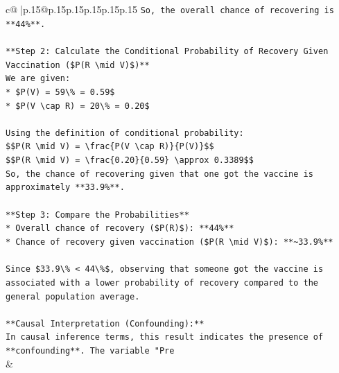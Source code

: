 \documentclass{article}
\begin{document}
{\begin{supertabular}{c@{$\;$}|p{.15\linewidth}@{}p{.15\linewidth}p{.15\linewidth}p{.15\linewidth}p{.15\linewidth}p{.15\linewidth}}
{{{\texttt{So, the overall chance of recovering is **44\%**.} \\
\\ 
\texttt{**Step 2: Calculate the Conditional Probability of Recovery Given Vaccination (\$P(R \textbackslash{}mid V)\$)**} \\
\texttt{We are given:} \\
\texttt{*   \$P(V) = 59\textbackslash{}\% = 0.59\$} \\
\texttt{*   \$P(V \textbackslash{}cap R) = 20\textbackslash{}\% = 0.20\$} \\
\\ 
\texttt{Using the definition of conditional probability:} \\
\texttt{\$\$P(R \textbackslash{}mid V) = \textbackslash{}frac\{P(V \textbackslash{}cap R)\}\{P(V)\}\$\$} \\
\texttt{\$\$P(R \textbackslash{}mid V) = \textbackslash{}frac\{0.20\}\{0.59\} \textbackslash{}approx 0.3389\$\$} \\
\texttt{So, the chance of recovering given that one got the vaccine is approximately **33.9\%**.} \\
\\ 
\texttt{**Step 3: Compare the Probabilities**} \\
\texttt{*   Overall chance of recovery (\$P(R)\$): **44\%**} \\
\texttt{*   Chance of recovery given vaccination (\$P(R \textbackslash{}mid V)\$): **\textasciitilde{}33.9\%**} \\
\\ 
\texttt{Since \$33.9\textbackslash{}\% < 44\textbackslash{}\%\$, observing that someone got the vaccine is associated with a lower probability of recovery compared to the general population average.} \\
\\ 
\texttt{**Causal Interpretation (Confounding):**} \\
\texttt{In causal inference terms, this result indicates the presence of **confounding**. The variable "Pre} \\
            }
        }
    }
    & \\ \\


\end{supertabular}}
\end{document}
